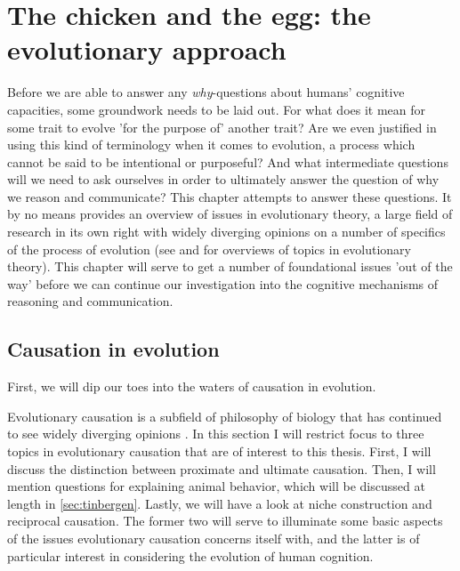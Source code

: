 \chapter{The chicken and the egg: the evolutionary approach}
\label{ch:evolution}

Before we are able to answer any \emph{why}-questions about humans' cognitive capacities, some groundwork needs to be laid out. For what does it mean for some trait to evolve 'for the purpose of' another trait? Are we even justified in using this kind of terminology when it comes to evolution, a process which cannot be said to be intentional or purposeful? And what intermediate questions will we need to ask ourselves in order to ultimately answer the question of why we reason and communicate?
This chapter attempts to  answer these questions. It by no means provides an overview of issues in evolutionary theory, a large field of research in its own right with widely diverging opinions on a number of specifics of the process of evolution (see \citet{Ariew02} and \citet{UllerLaland19} for overviews of topics in evolutionary theory).
This chapter will serve to get a number of foundational issues 'out of the way' before we can continue our investigation into the cognitive mechanisms of reasoning and communication.

\section{Causation in evolution}
\label{sec:causation-evolution}

First, we will dip our toes into the waters of causation in evolution.

Evolutionary causation is a subfield of philosophy of biology that has continued to see widely diverging opinions \citep{Baedke2021, UllerLaland19}. In this section I will restrict focus to three topics in evolutionary causation that are of interest to this thesis. First, I will discuss the distinction between proximate and ultimate causation. Then, I will mention  questions for explaining animal behavior, which will be discussed at length in \cref{sec:tinbergen}. Lastly, we will have a look at niche construction and reciprocal causation.
The former two will serve to illuminate some basic aspects of the issues evolutionary causation concerns itself with, and the latter is of particular interest in considering the evolution of human cognition.

